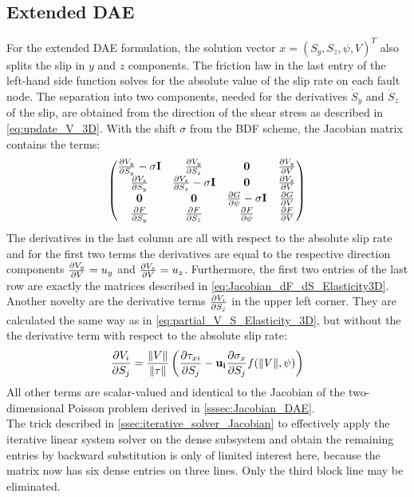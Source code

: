 \subsection{Extended DAE}
For the extended DAE formulation, the solution vector $x = (S_y, S_z, \psi, V)^T$ also splits the slip in $y$ and $z$ components. The friction law in the last entry of the left-hand side function solves for the absolute value of the slip rate on each fault node. The separation into two components, needed for the derivatives $\dot{S}_y$ and $\dot{S}_z$ of the slip, are obtained from the direction of the shear stress as described in \autoref{eq:update_V_3D}. With the shift $\sigma$ from the BDF scheme, the Jacobian matrix contains the terms:
\begin{equation}
	\begin{pmatrix}
		\pdv{V_y}{S_y}-\sigma\mathbf{I} & \pdv{V_y}{S_z}                  & \mathbf{0}                      & \pdv{V_y}{V} \\
		\pdv{V_z}{S_y}                  & \pdv{V_z}{S_z}-\sigma\mathbf{I} & \mathbf{0}                      & \pdv{V_z}{V} \\ 
		\mathbf{0}                      & \mathbf{0}                      & \pdv{G}{\psi} -\sigma\mathbf{I} & \pdv{G}{V}   \\
		\pdv{F}{S_y}                    & \pdv{F}{S_z}                    & \pdv{F}{\psi}                   & \pdv{F}{V}
 	\end{pmatrix}
\end{equation}
The derivatives in the last column are all with respect to the absolute slip rate and for the first two terms the derivatives are equal to the respective direction components $\pdv{V_y}{V} = u_y$ and $\pdv{V_z}{V} = u_z$. Furthermore, the first two entries of the last row are exactly the matrices described in \autoref{eq:Jacobian_dF_dS_Elasticity3D}. Another novelty are the derivative terms $\pdv{V_i}{S_j}$ in the upper left corner. They are calculated the same way as in \autoref{eq:partial_V_S_Elasticity_3D}, but without the the derivative term with respect to the absolute slip rate:
\begin{equation}
	\pdv{V_i}{S_j} = \frac{\norm{V}}{\norm{\tau}}\left(\pdv{\tau_{xi}}{S_j} - \mathbf{u_i}\pdv{\sigma_x}{S_j}f(\norm{V}, \psi)\right)
\end{equation}
All other terms are scalar-valued and identical to the Jacobian of the two-dimensional Poisson problem derived in \autoref{sssec:Jacobian_DAE}. \\
The trick described in \autoref{ssec:iterative_solver_Jacobian} to effectively apply the iterative linear system solver on the dense subsystem and obtain the remaining entries by backward substitution is only of limited interest here, because the matrix now has six dense entries on three lines. Only the third block line may be eliminated. \\

